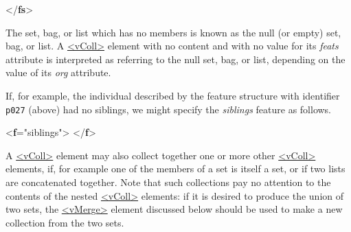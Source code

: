 \begin{shaded}
\hspace*{1em}\hspace*{1em}\hspace*{1em}\mbox{}\newline 
\hspace*{1em}\hspace*{1em}\mbox{}\newline 
\hspace*{1em}\mbox{}\newline 
{}\mbox{}\newline 
{</\textbf{fs}>}\end{shaded}\egroup\par \par
The set, bag, or list which has no members is known as the null (or empty) set, bag, or list. A \hyperref[TEI.vColl]{<vColl>} element with no content and with no value for its {\itshape feats} attribute is interpreted as referring to the null set, bag, or list, depending on the value of its {\itshape org} attribute.\par
If, for example, the individual described by the feature structure with identifier \texttt{p027} (above) had no siblings, we might specify the \textit{siblings} feature as follows. \par\bgroup{}\exampleFont \begin{shaded}\noindent\mbox{}{<\textbf{f}\hspace*{1em}{name}="{siblings}">}\mbox{}\newline 
{}\mbox{}\newline 
{</\textbf{f}>}\end{shaded}\egroup\par \par
A \hyperref[TEI.vColl]{<vColl>} element may also collect together one or more other \hyperref[TEI.vColl]{<vColl>} elements, if, for example one of the members of a set is itself a set, or if two lists are concatenated together. Note that such collections pay no attention to the contents of the nested \hyperref[TEI.vColl]{<vColl>} elements: if it is desired to produce the union of two sets, the \hyperref[TEI.vMerge]{<vMerge>} element discussed below should be used to make a new collection from the two sets.
